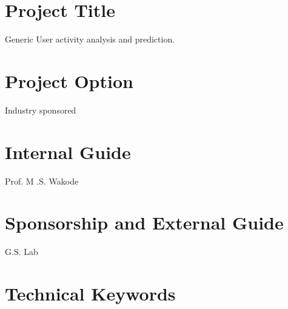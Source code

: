 \documentclass[oneside,a4paper,12pt]{book}
\begin{document}
\section{Project Title}
 Generic User activity analysis and prediction.

\section{ Project Option }
Industry sponsored 

\section{Internal Guide}
Prof. M .S. Wakode 

\section{ Sponsorship and External Guide} 
G.S. Lab


\section{Technical Keywords }
\end{document}
